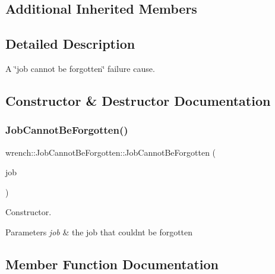 \subsection*{Additional Inherited Members}


\subsection{Detailed Description}
A \char`\"{}job cannot be forgotten\char`\"{} failure cause. 

\subsection{Constructor \& Destructor Documentation}
\mbox{\label{classwrench_1_1_job_cannot_be_forgotten_aa36377ad34fc84b23ae3fe518db538fa}} 
\subsubsection{\texorpdfstring{Job\+Cannot\+Be\+Forgotten()}{JobCannotBeForgotten()}}
{\footnotesize\ttfamily wrench\+::\+Job\+Cannot\+Be\+Forgotten\+::\+Job\+Cannot\+Be\+Forgotten (\begin{DoxyParamCaption}\item[{\hyperlink{classwrench_1_1_workflow_job}{Workflow\+Job} $\ast$}]{job }\end{DoxyParamCaption})}



Constructor. 


\begin{DoxyParams}{Parameters}
{\em job} & the job that couldn\textquotesingle{}t be forgotten \\
\hline
\end{DoxyParams}


\subsection{Member Function Documentation}
\mbox{\label{classwrench_1_1_job_cannot_be_forgotten_ae21aa5adc48ff0998d9fefc7f2c4c9f9}} 
